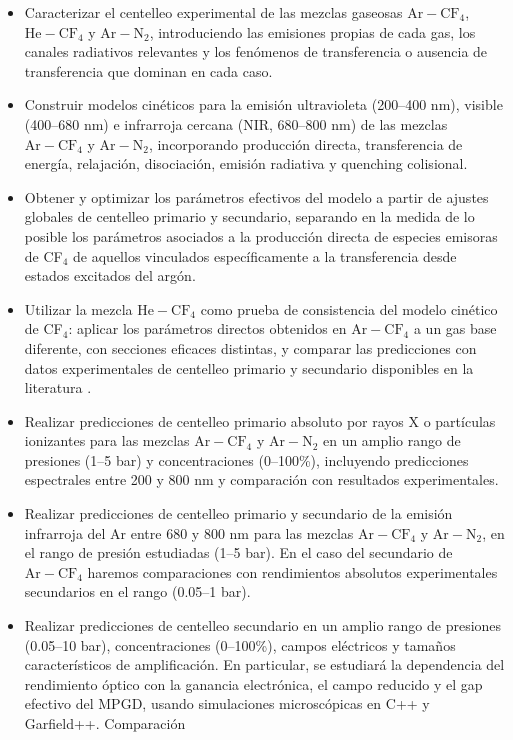 \documentclass[12pt,a4paper]{article}
\newcommand{\N}{\mathrm{N}}
\newcommand{\He}{\mathrm{He}}
\newcommand{\Ar}{\mathrm{Ar}}
\newcommand{\CF}{\mathrm{CF}}
\begin{document}
\begin{itemize}
    \item Caracterizar el centelleo experimental de las mezclas gaseosas $\Ar-\CF_4$, $\He-\CF_4$ y $\Ar-\N_2$, introduciendo las emisiones propias de cada gas, los canales radiativos relevantes y los fenómenos de transferencia o ausencia de transferencia que dominan en cada caso.

    \item Construir modelos cinéticos para la emisión ultravioleta (200--400 nm), visible (400--680 nm) e infrarroja cercana (NIR, 680--800 nm) de las mezclas $\Ar-\CF_4$ y $\Ar-\N_2$, incorporando producción directa, transferencia de energía, relajación, disociación, emisión radiativa y quenching colisional. 

    \item Obtener y optimizar los parámetros efectivos del modelo a partir de ajustes globales de centelleo primario y secundario, separando en la medida de lo posible los parámetros asociados a la producción directa de especies emisoras de CF$_4$ de aquellos vinculados específicamente a la transferencia desde estados excitados del argón.

    \item Utilizar la mezcla $\He-\CF_4$ como prueba de consistencia del modelo cinético de CF$_4$: aplicar los parámetros directos obtenidos en $\Ar-\CF_4$ a un gas base diferente, con secciones eficaces distintas, y comparar las predicciones con datos experimentales de centelleo primario y secundario disponibles en la literatura \cite{fraga2003the,FlorianPrimarySecundary}.

    \item Realizar predicciones de centelleo primario absoluto por rayos X o partículas ionizantes para las mezclas $\Ar-\CF_4$ y $\Ar-\N_2$ en un amplio rango de presiones (1--5 bar) y concentraciones (0--100\%), incluyendo predicciones espectrales entre 200 y 800 nm y comparación con resultados experimentales.
    
    \item  Realizar predicciones de centelleo primario y secundario de la emisión infrarroja del Ar entre 680 y 800 nm para las mezclas $\Ar-\CF_4$ y $\Ar-\N_2$, en el rango de presión estudiadas (1--5 bar). En el caso del secundario de $\Ar-\CF_4$ haremos comparaciones con rendimientos absolutos experimentales secundarios en el rango (0.05--1 bar).

    \item Realizar predicciones de centelleo secundario en un amplio rango de presiones (0.05--10 bar), concentraciones (0--100\%), campos eléctricos y tamaños característicos de amplificación. En particular, se estudiará la dependencia del rendimiento óptico con la ganancia electrónica, el campo reducido y el gap efectivo del MPGD, usando simulaciones microscópicas en C++ y Garfield++. Comparación 


\end{itemize}
\end{document}
